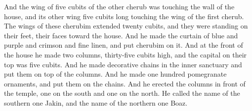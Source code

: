 \begin{biblechapter}
\verse And the wing of five cubits of the other cherub was touching the wall of the house, and its other wing five cubits long touching the wing of the first cherub.
\verse The wings of these cherubim extended twenty cubits, and they were standing on their feet, their faces toward the house.
\verse And he made the curtain of blue and purple and crimson and fine linen, and put cherubim on it.
\verse And at the front of the house he made two columns, thirty-five cubits high, and the capital on their top was five cubits.
\verse And he made decorative chains in the inner sanctuary and put them on top of the columns. And he made one hundred pomegranate ornaments, and put them on the chains.
\verse And he erected the columns in front of the temple, one on the south and one on the north. He called the name of the southern one Jakin, and the name of the northern one Boaz.
\end{biblechapter}

